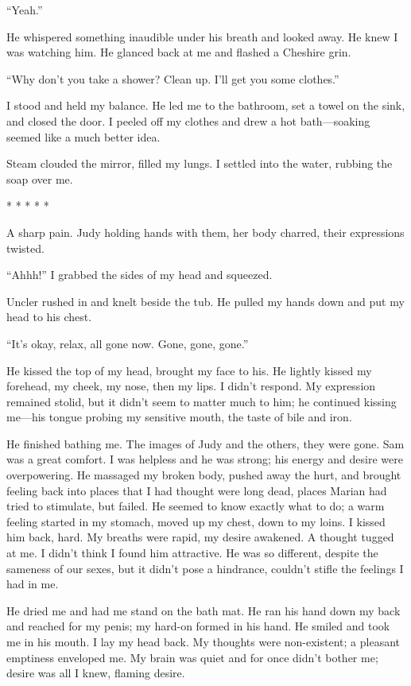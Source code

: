 ``Yeah.''

He whispered something inaudible under his breath and looked away. He
knew I was watching him. He glanced back at me and flashed a Cheshire
grin.

``Why don't you take a shower? Clean up. I'll get you some clothes.''

I stood and held my balance. He led me to the bathroom, set a towel on
the sink, and closed the door. I peeled off my clothes and drew a hot
bath---soaking seemed like a much better idea.

Steam clouded the mirror, filled my lungs. I settled into the water,
rubbing the soap over me.

* * * * *

A sharp pain. Judy holding hands with them, her body charred, their
expressions twisted.

``Ahhh!'' I grabbed the sides of my head and squeezed.

Uncler rushed in and knelt beside the tub. He pulled my hands down and
put my head to his chest.

``It's okay, relax, all gone now. Gone, gone, gone.''

He kissed the top of my head, brought my face to his. He lightly kissed
my forehead, my cheek, my nose, then my lips. I didn't respond. My
expression remained stolid, but it didn't seem to matter much to him; he
continued kissing me---his tongue probing my sensitive mouth, the taste
of bile and iron.

He finished bathing me. The images of Judy and the others, they were
gone. Sam was a great comfort. I was helpless and he was strong; his
energy and desire were overpowering. He massaged my broken body, pushed
away the hurt, and brought feeling back into places that I had thought
were long dead, places Marian had tried to stimulate, but failed. He
seemed to know exactly what to do; a warm feeling started in my stomach,
moved up my chest, down to my loins. I kissed him back, hard. My breaths
were rapid, my desire awakened. A thought tugged at me. I didn't think I
found him attractive. He was so different, despite the sameness of our
sexes, but it didn't pose a hindrance, couldn't stifle the feelings I
had in me.

He dried me and had me stand on the bath mat. He ran his hand down my
back and reached for my penis; my hard-on formed in his hand. He smiled
and took me in his mouth. I lay my head back. My thoughts were
non-existent; a pleasant emptiness enveloped me. My brain was quiet and
for once didn't bother me; desire was all I knew, flaming desire.


